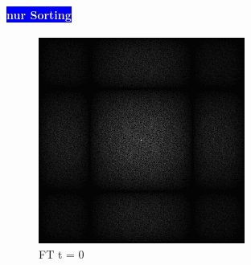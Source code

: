 \begin{figure}[H]
\begin{tcolorbox}[boxrule=4pt,sharp corners=downhill,title=Bedeutung des Retargeting]
    \paragraph{\hfill\colorbox{blue}{\textcolor{white}{nur Sorting}}}
    \centering
    \begin{subfigure}[b]{0.2\linewidth}
      \includegraphics[width=\linewidth]{content/TemporalerAlg/Bilder/Retargeting/Bedeutung Retargeting/Sorting_Small_Block/Spektrum/Ausschnitt1.png}
       \caption{FT t = 0}
       \label{pic:sortier_t0}
    \end{subfigure}
    \begin{subfigure}[b]{0.2\linewidth}

\end{subfigure}
\end{tcolorbox}
\end{figure}
